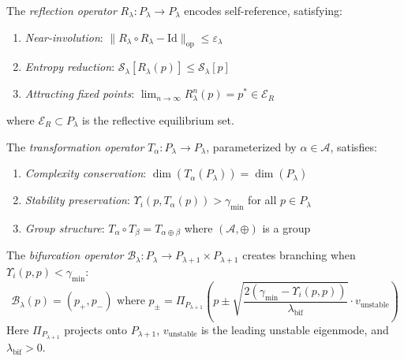 \begin{definition}
\label{definition:bk6_reflection_operator_complete}
The \emph{reflection operator} $R_\lambda : P_{\lambda} \to P_{\lambda}$ encodes self-reference, satisfying:
\begin{enumerate}
\item \emph{Near-involution}: $\|R_\lambda \circ R_\lambda - \text{Id}\|_{\text{op}} \leq \varepsilon_\lambda$
\item \emph{Entropy reduction}: $\mathcal{S}_\lambda[R_\lambda(p)] \leq \mathcal{S}_\lambda[p]$
\item \emph{Attracting fixed points}: $\lim_{n \to \infty} R_\lambda^n(p) = p^* \in \mathcal{E}_R$
\end{enumerate}
where $\mathcal{E}_R \subset P_\lambda$ is the reflective equilibrium set.
\end{definition}

\begin{definition}
\label{definition:bk6_transformation_operator_complete}
The \emph{transformation operator} $T_\alpha : P_{\lambda} \to P_{\lambda}$, parameterized by $\alpha \in \mathcal{A}$, satisfies:
\begin{enumerate}
\item \emph{Complexity conservation}: $\dim(T_\alpha(P_{\lambda})) = \dim(P_{\lambda})$
\item \emph{Stability preservation}: $\Upsilon_i(p, T_\alpha(p)) > \gamma_{\min}$ for all $p \in P_{\lambda}$
\item \emph{Group structure}: $T_\alpha \circ T_\beta = T_{\alpha \oplus \beta}$ where $(\mathcal{A}, \oplus)$ is a group
\end{enumerate}
\end{definition}

\begin{definition}
\label{definition:bk6_bifurcation_operator_complete}
The \emph{bifurcation operator} $\mathcal{B}_\lambda : P_\lambda \to P_{\lambda+1} \times P_{\lambda+1}$ creates branching when $\Upsilon_i(p,p) < \gamma_{\min}$:
\begin{equation}
\mathcal{B}_\lambda(p) = (p_+, p_-) \text{ where } p_\pm = \Pi_{P_{\lambda+1}}\left(p \pm \sqrt{\frac{2(\gamma_{\min} - \Upsilon_i(p,p))}{\lambda_{\text{bif}}}} \cdot v_{\text{unstable}}\right)
\end{equation}
Here $\Pi_{P_{\lambda+1}}$ projects onto $P_{\lambda+1}$, $v_{\text{unstable}}$ is the leading unstable eigenmode, and $\lambda_{\text{bif}} > 0$.
\end{definition}

